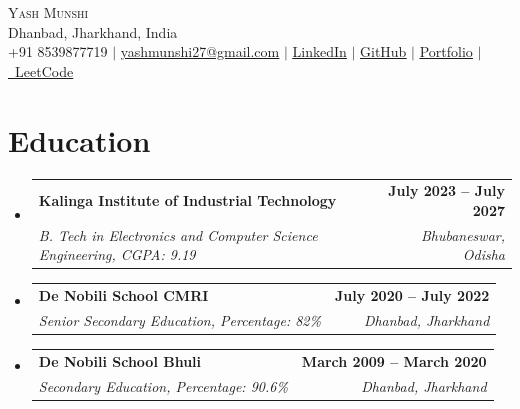 \documentclass[letterpaper,10pt]{article}
\makeatletter
\newcommand{\resumeSubheading}[4]{
  \vspace{-2pt}\item
    \begin{tabular*}{1.0\textwidth}[t]{l@{\extracolsep{\fill}}r}
      \textbf{#1} & \textbf{\small #2} \\
      \textit{\small#3} & \textit{\small #4} \\
    \end{tabular*}\vspace{-7pt}
}
\newcommand{\resumeSubHeadingListStart}{\begin{itemize}[leftmargin=0.0in, label={}]}
\newcommand{\resumeSubHeadingListEnd}{\end{itemize}}
\makeatother
\begin{document}
\begin{center}
    {\Huge \scshape Yash Munshi} \\ \vspace{1pt}
    Dhanbad, Jharkhand, India \\ \vspace{1pt}
    \small  +91 8539877719 $|$ \href{mailto:yashmunshi27@gmail.com}{\underline{yashmunshi27@gmail.com}} $|$ 
    \href{https://www.linkedin.com/in/yash-munshi-a0408b337/}{\underline{LinkedIn}} $|$ 
    \href{https://github.com/YashIsTheBest247}{ \underline{GitHub}} $|$ 
   \href{https://yash-munshi.vercel.app}{\underline{Portfolio}} $|$ 
   \href{https://leetcode.com/u/me_yashmunshi/}{\raisebox{-0.2\height}{}\ \underline{LeetCode}}
\end{center}

\section{Education}
  \resumeSubHeadingListStart
    \resumeSubheading
      {Kalinga Institute of Industrial Technology}{July 2023 -- July 2027}
      {B. Tech in Electronics and Computer Science Engineering, CGPA: 9.19}{Bhubaneswar, Odisha}
    \resumeSubheading
      {De Nobili School CMRI}{July 2020 -- July 2022}
      {Senior Secondary Education, Percentage: 82\%}{Dhanbad, Jharkhand}
    \resumeSubheading
      {De Nobili School Bhuli}{March 2009 -- March 2020}
      {Secondary Education, Percentage: 90.6\%}{Dhanbad, Jharkhand}
  \resumeSubHeadingListEnd

\end{document}
